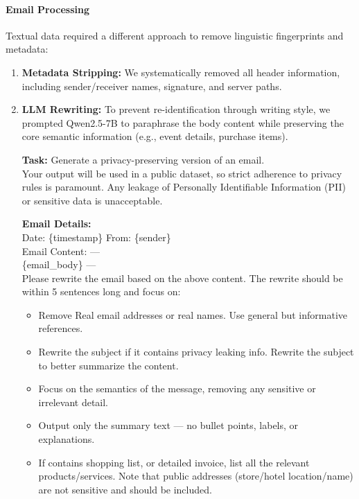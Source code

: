 \documentclass{article}
\theoremstyle{plain}
\theoremstyle{definition}
\theoremstyle{remark}
\begin{document}
\paragraph{Email Processing} Textual data required a different approach to remove linguistic fingerprints and metadata: 
\begin{enumerate} \item \textbf{Metadata Stripping:} We systematically removed all header information, including sender/receiver names, signature, and server paths.

\item \textbf{LLM Rewriting:} To prevent re-identification through writing style, we prompted Qwen2.5-7B to paraphrase the body content while preserving the core semantic information (e.g., event details, purchase items).

\begin{tcolorbox}[colback=gray!10!white, colframe=black, arc=2mm, title=\textbf{Email Rewriting \& Sanitization Prompt}]
    \textbf{Task:} Generate a privacy-preserving version of an email.\\
    Your output will be used in a public dataset, so strict adherence to privacy rules is paramount. Any leakage of Personally Identifiable Information (PII) or sensitive data is unacceptable.
    
    \textbf{Email Details:}\\
    Date: \{timestamp\} \quad From: \{sender\}\\
    Email Content: ---\\ \{email\_body\} ---\\
    
    Please rewrite the email based on the above content. The rewrite should be within 5 sentences long and focus on:
    \begin{itemize}
        \item Remove Real email addresses or real names. Use general but informative references.
        \item Rewrite the subject if it contains privacy leaking info. Rewrite the subject to better summarize the content.
        \item Focus on the semantics of the message, removing any sensitive or irrelevant detail.
        \item Output only the summary text — no bullet points, labels, or explanations.
        \item If contains shopping list, or detailed invoice, list all the relevant products/services. Note that public addresses (store/hotel location/name) are not sensitive and should be included.
    \end{itemize}


\end{tcolorbox}
\end{enumerate}
\end{document}
